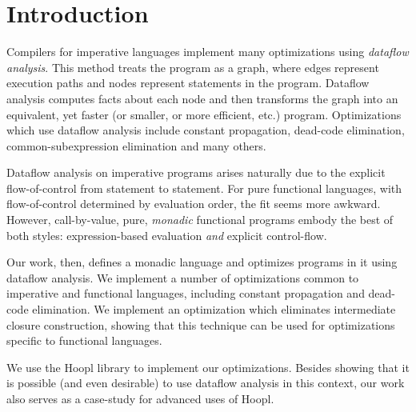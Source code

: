 \dodocclass



\chapter{Introduction}

Compilers  for imperative languages implement many optimizations using
\emph{dataflow analysis}. This method treats the program as a graph,
where edges represent execution paths and nodes represent statements
in the program. Dataflow analysis computes facts about each node and
then transforms the graph into an equivalent, yet faster (or smaller,
or more efficient, etc.) program. Optimizations which use dataflow
analysis include constant propagation, dead-code elimination,
common-subexpression elimination and many others.

Dataflow analysis on imperative programs arises naturally due to the
explicit flow-of-control from statement to statement. For pure
functional languages, with flow-of-control determined by evaluation
order, the fit seems more awkward. However, call-by-value, pure,
\emph{monadic} functional programs embody the best of both
styles: expression-based evaluation \emph{and} explicit
control-flow. 

Our work, then, defines a monadic language and optimizes programs in
it using dataflow analysis. We implement a number of optimizations
common to imperative and functional languages, including constant
propagation and dead-code elimination. We implement an optimization
which eliminates intermediate closure construction, showing that this
technique can be used for optimizations specific to functional
languages. %

We use the Hoopl library \citep{Hoopl-3.8.7.0} to implement our
optimizations. Besides showing that it is possible (and even
desirable) to use dataflow analysis in this context, our work also
serves as a case-study for advanced uses of Hoopl.


